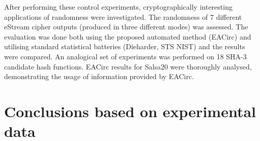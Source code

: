 \documentclass[12pt,oneside]{fithesis2}
\begin{document}
After performing these control experiments, cryptographically interesting applications of randomness were investigated.
The randomness of 7 different eStream cipher outputs (produced in three different modes) was assessed.
The evaluation was done both using the proposed automated method (EACirc) and utilising standard statistical batteries
(Dieharder, STS NIST) and the results were compared. An analogical set of experiments was performed 
on 18 SHA-3 candidate hash functions.
EACirc results for Salsa20 were thoroughly analysed, demonstrating the usage of information provided by EACirc.

\section{Conclusions based on experimental data}
\label{sec:outro-conclusions}
\end{document}
